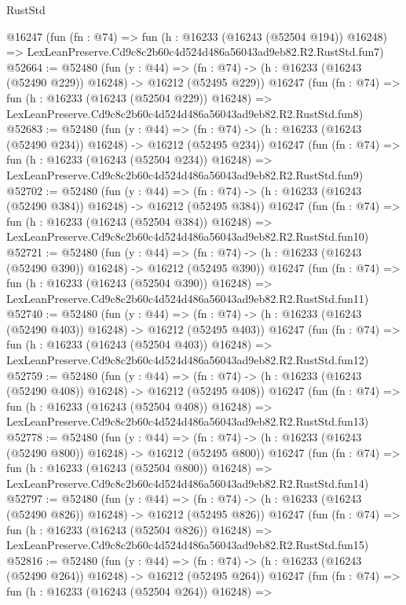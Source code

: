 \begin{lexlean}{RustStd}
\begin{coremodule}
    @16247
    (fun (fn : @74) =>
    fun (h : @16233 (@16243 (@52504 @194)) @16248) =>
    LexLeanPreserve.Cd9c8c2b60c4d524d486a56043ad9eb82.R2.RustStd.fun7)
@52664 := @52480
    (fun (y : @44) =>
    (fn : @74) -> (h : @16233 (@16243 (@52490 @229)) @16248) -> @16212 (@52495 @229))
    @16247
    (fun (fn : @74) =>
    fun (h : @16233 (@16243 (@52504 @229)) @16248) =>
    LexLeanPreserve.Cd9c8c2b60c4d524d486a56043ad9eb82.R2.RustStd.fun8)
@52683 := @52480
    (fun (y : @44) =>
    (fn : @74) -> (h : @16233 (@16243 (@52490 @234)) @16248) -> @16212 (@52495 @234))
    @16247
    (fun (fn : @74) =>
    fun (h : @16233 (@16243 (@52504 @234)) @16248) =>
    LexLeanPreserve.Cd9c8c2b60c4d524d486a56043ad9eb82.R2.RustStd.fun9)
@52702 := @52480
    (fun (y : @44) =>
    (fn : @74) -> (h : @16233 (@16243 (@52490 @384)) @16248) -> @16212 (@52495 @384))
    @16247
    (fun (fn : @74) =>
    fun (h : @16233 (@16243 (@52504 @384)) @16248) =>
    LexLeanPreserve.Cd9c8c2b60c4d524d486a56043ad9eb82.R2.RustStd.fun10)
@52721 := @52480
    (fun (y : @44) =>
    (fn : @74) -> (h : @16233 (@16243 (@52490 @390)) @16248) -> @16212 (@52495 @390))
    @16247
    (fun (fn : @74) =>
    fun (h : @16233 (@16243 (@52504 @390)) @16248) =>
    LexLeanPreserve.Cd9c8c2b60c4d524d486a56043ad9eb82.R2.RustStd.fun11)
@52740 := @52480
    (fun (y : @44) =>
    (fn : @74) -> (h : @16233 (@16243 (@52490 @403)) @16248) -> @16212 (@52495 @403))
    @16247
    (fun (fn : @74) =>
    fun (h : @16233 (@16243 (@52504 @403)) @16248) =>
    LexLeanPreserve.Cd9c8c2b60c4d524d486a56043ad9eb82.R2.RustStd.fun12)
@52759 := @52480
    (fun (y : @44) =>
    (fn : @74) -> (h : @16233 (@16243 (@52490 @408)) @16248) -> @16212 (@52495 @408))
    @16247
    (fun (fn : @74) =>
    fun (h : @16233 (@16243 (@52504 @408)) @16248) =>
    LexLeanPreserve.Cd9c8c2b60c4d524d486a56043ad9eb82.R2.RustStd.fun13)
@52778 := @52480
    (fun (y : @44) =>
    (fn : @74) -> (h : @16233 (@16243 (@52490 @800)) @16248) -> @16212 (@52495 @800))
    @16247
    (fun (fn : @74) =>
    fun (h : @16233 (@16243 (@52504 @800)) @16248) =>
    LexLeanPreserve.Cd9c8c2b60c4d524d486a56043ad9eb82.R2.RustStd.fun14)
@52797 := @52480
    (fun (y : @44) =>
    (fn : @74) -> (h : @16233 (@16243 (@52490 @826)) @16248) -> @16212 (@52495 @826))
    @16247
    (fun (fn : @74) =>
    fun (h : @16233 (@16243 (@52504 @826)) @16248) =>
    LexLeanPreserve.Cd9c8c2b60c4d524d486a56043ad9eb82.R2.RustStd.fun15)
@52816 := @52480
    (fun (y : @44) =>
    (fn : @74) -> (h : @16233 (@16243 (@52490 @264)) @16248) -> @16212 (@52495 @264))
    @16247
    (fun (fn : @74) =>
    fun (h : @16233 (@16243 (@52504 @264)) @16248) =>

\end{coremodule}
\end{lexlean}

